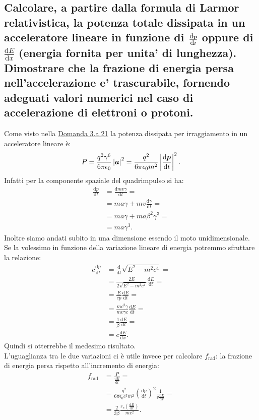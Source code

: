 \subsection[]{Calcolare, a partire dalla formula di Larmor relativistica, la potenza totale dissipata in un acceleratore lineare in funzione di $\frac{\mbox{d} \boldsymbol{p}}{\mbox{d} t}$ oppure di $\frac{\mbox{d} E}{\mbox{d} x}$ (energia fornita per unita’ di lunghezza). Dimostrare che la frazione di energia persa nell’accelerazione e’ trascurabile, fornendo adeguati valori numerici nel caso di accelerazione di elettroni o protoni.}
\label{sec:3.b.23}
Come visto nella \hyperref[sec:3.a.21]{Domanda 3.a.21} la potenza dissipata per irraggiamento in un acceleratore lineare è:
\[
	P = \frac{q^2\gamma^6}{6\pi\epsilon_0}\left| \boldsymbol{a} \right|^2=\frac{q^2}{6\pi\epsilon_0m^2}\left| \frac{\mbox{d} \boldsymbol{p}}{\mbox{d} t}  \right|^2
.\] 
Infatti per la componente spaziale del quadrimpulso si ha:
\begin{align*}
	\frac{\mbox{d} p}{\mbox{d} t} 	&= \frac{\mbox{d} mv\gamma}{\mbox{d} t} =\\
				      	&= m a \gamma + m v \frac{\mbox{d} \gamma}{\mbox{d} t} =\\
					&= ma\gamma + ma\beta^2\gamma^3=\\
					&= ma\gamma^3 
.\end{align*}
Inoltre siamo andati subito in una dimensione essendo il moto unidimensionale.
Se la volessimo in funzione della variazione lineare di energia potremmo sfruttare la relazione:
\begin{align*}
	c \frac{\mbox{d} p}{\mbox{d} t} &= \frac{\mbox{d} }{\mbox{d} t}\sqrt{E^2-m^2c^4} =\\
	&= \frac{2E}{2\sqrt{E^2-m^2c^4} }\frac{\mbox{d} E}{\mbox{d} t}=  \\
	&= \frac{E}{cp}\frac{\mbox{d} E}{\mbox{d} t} = \\
	&= \frac{mc^2\gamma}{mv\gamma c}\frac{\mbox{d} E}{\mbox{d} t} = \\
	&= \frac{1}{\beta}\frac{\mbox{d} E}{\mbox{d} t} = \\
	&= c \frac{\mbox{d} E}{\mbox{d} x}  
.\end{align*}
Quindi si otterrebbe il medesimo risultato.\\
L'uguaglianza tra le due variazioni ci è utile invece per calcolare $f_{\text{rad}}$: la frazione di energia persa rispetto all'incremento di energia:
\begin{align*}
	f_{\text{rad}}	&= \frac{P}{\frac{\mbox{d} E}{\mbox{d} t} }=\\
		      	&= \frac{q^2}{6\pi\epsilon_0 c^3m^2}\left( \frac{\mbox{d} p}{\mbox{d} t} \right)^2 \frac{1}{v \frac{\mbox{d} E}{\mbox{d} x} }=  \\
			&= \frac{2}{3\beta} \frac{r_e \left( \frac{\mbox{d} E}{\mbox{d} x}  \right) }{mc^2} 
.\end{align*}
